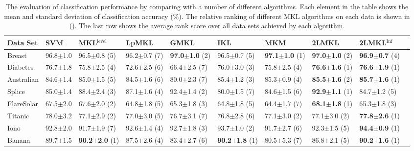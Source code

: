 \begin{table}[!thb] \label{table:result}
\centering \caption{The evaluation of classification performance by
comparing with a number of different algorithms. Each element in the table shows the
mean and standard deviation of classification accuracy (\%). The relative ranking of
different MKL algorithms on each data is shown in (). The last row shows the average
rank score over all data sets achieved by each algorithm.}
\begin{center}
\setlength{\tabcolsep}{1.8pt}
{\scriptsize
\begin{tabular}{l|l|llllllll}
\hline
Data Set &SVM & MKL$^{\mathrm{level}}$
    &LpMKL  &GMKL  &IKL & MKM & 2LMKL & 2LMKL$^{\mathrm{Inf}}$\\
\hline
\hline              %
Breast             &96.8$\pm$1.0   &96.5$\pm$0.8  (5) &96.2$\pm$0.7 (7)  &{\bf 97.0$\pm$1.0} (2)  &96.5$\pm$0.7 (5)  &{\bf97.1$\pm$1.0} (1) &{\bf 97.0$\pm$1.0} (2) &{\bf96.9$\pm$0.7} (4)\\
{Diabetes}     &76.7$\pm$1.8   &75.8$\pm$2.5 (4)  &72.6$\pm$2.5 (6)   &66.4$\pm$2.5 (7)   &76.0$\pm$3.0 (3)  &75.8$\pm$2.5  (4)  &{\bf76.6$\pm$1.6} (1)  &{\bf76.6$\pm$1.9} (1)\\
{Australian}   &84.6$\pm$1.4   &85.0$\pm$1.5 (5)  &84.5$\pm$1.6 (6)  &80.0$\pm$2.3 (7)  &85.4$\pm$1.2 (3)  &85.3$\pm$0.9 (4)    &{\bf85.5$\pm$1.6} (2)   &{\bf85.7$\pm$1.6} (1)\\
Splice             &85.0$\pm$1.4   &88.4$\pm$2.4 (3)    &87.1$\pm$1.6 (4)   &92.4$\pm$1.4 (2)   &80.0$\pm$1.5 (7)   &84.6$\pm$1.5 (6)     &{\bf92.9$\pm$1.1} (1)    &84.7$\pm$1.2 (5)\\
{FlareSolar}  &67.5$\pm$2.0   &67.6$\pm$2.0 (2)    &64.8$\pm$1.8 (5)   &65.3$\pm$1.8 (3)    &64.8$\pm$1.8 (5)  &64.4$\pm$1.7 (7)     &{\bf68.1$\pm$1.8} (1)    &65.3$\pm$1.8 (3)\\
Titanic           &78.0$\pm$3.2   &77.1$\pm$2.9 (2)    &77.0$\pm$3.0 (5)    &76.7$\pm$3.1 (7)   &76.8$\pm$2.8 (6)   &77.1$\pm$3.0 (2)     &77.1$\pm$3.0 (2)    &{\bf77.8$\pm$2.6} (1)\\
Iono               &92.8$\pm$2.0   &91.7$\pm$1.9 (7)    &92.6$\pm$1.4 (4)   &92.7$\pm$1.8 (3)   &93.7$\pm$1.0 (2)    &91.7$\pm$2.7 (6)     &92.3$\pm$1.5 (5)   &{\bf94.4$\pm$0.9} (1)\\
Banana          &89.7$\pm$1.5   &{\bf90.2$\pm$2.0} (1)    &87.5$\pm$2.6 (4)   &83.4$\pm$2.7 (6)   &{\bf90.2$\pm$1.8} (1)   &80.5$\pm$5.3 (7)  &86.8$\pm$2.1 (5)    &{\bf90.2$\pm$1.6} (1)\\

\end{tabular}}
\end{center}
\end{table}
